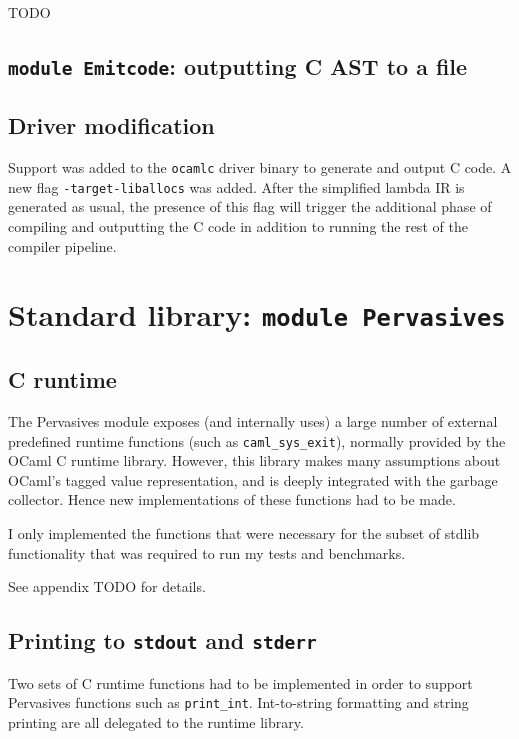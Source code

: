 \documentclass[12pt,a4paper,twoside,openright]{report}
\begin{document}
TODO

\subsection{\texttt{module Emitcode}: outputting C AST to a file}

\subsection{Driver modification}

Support was added to the \lstinline!ocamlc! driver binary to generate and
output C code. A new flag \lstinline!-target-liballocs! was added. After the
simplified lambda IR is generated as usual, the presence of this flag will
trigger the additional phase of compiling and outputting the C code in addition
to running the rest of the compiler pipeline.

\section{Standard library: \texttt{module Pervasives}}

\subsection{C runtime}

The Pervasives module exposes (and internally uses) a large number of external
predefined runtime functions (such as \lstinline!caml_sys_exit!), normally
provided by the OCaml C runtime library. However, this library makes many
assumptions about OCaml's tagged value representation, and is deeply integrated
with the garbage collector. Hence new implementations of these functions had to
be made.

I only implemented the functions that were necessary for the subset of stdlib functionality that was required to run my tests and benchmarks.

See appendix TODO for details.

\subsection{Printing to \texttt{stdout} and \texttt{stderr}}

Two sets of C runtime functions had to be implemented in order to support
Pervasives functions such as \lstinline!print_int!. Int-to-string formatting
and string printing are all delegated to the runtime library.
\end{document}
